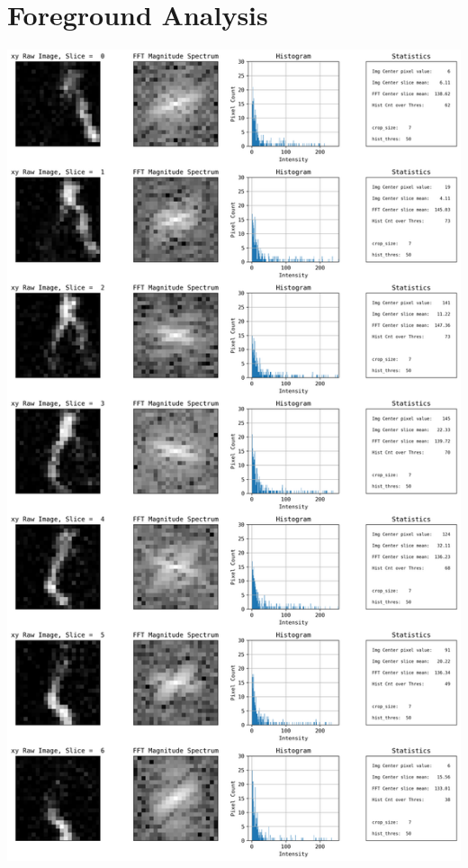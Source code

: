 \documentclass{neu_handout}
\begin{document}
\section{Foreground Analysis}
\includegraphics[width=0.7\linewidth]{foreground-xy-1}
\end{document}
